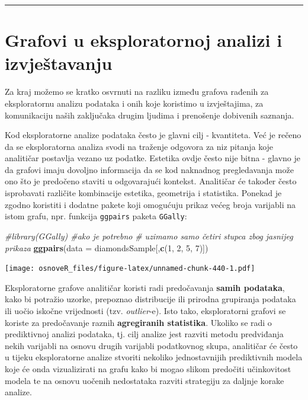 \documentclass[]{book}
\newenvironment{Shaded}{\begin{snugshade}}{\end{snugshade}}
\newcommand{\KeywordTok}[1]{\textcolor[rgb]{0.13,0.29,0.53}{\textbf{#1}}}
\newcommand{\DataTypeTok}[1]{\textcolor[rgb]{0.13,0.29,0.53}{#1}}
\newcommand{\DecValTok}[1]{\textcolor[rgb]{0.00,0.00,0.81}{#1}}
\newcommand{\CommentTok}[1]{\textcolor[rgb]{0.56,0.35,0.01}{\textit{#1}}}
\newcommand{\NormalTok}[1]{#1}
\theoremstyle{definition}
\theoremstyle{definition}
\theoremstyle{definition}
\theoremstyle{remark}
\begin{document}
\begin{center}\rule{0.5\linewidth}{\linethickness}\end{center}

\section{Grafovi u eksploratornoj analizi i
izvještavanju}\label{grafovi-u-eksploratornoj-analizi-i-izvjestavanju}

Za kraj možemo se kratko osvrnuti na razliku između grafova rađenih za
eksploratornu analizu podataka i onih koje koristimo u izvještajima, za
komunikaciju naših zaključaka drugim ljudima i prenošenje dobivenih
saznanja.

Kod eksploratorne analize podataka često je glavni cilj - kvantiteta.
Već je rečeno da se eksploratorna analiza svodi na traženje odgovora za
niz pitanja koje analitičar postavlja vezano uz podatke. Estetika ovdje
često nije bitna - glavno je da grafovi imaju dovoljno informacija da se
kod naknadnog pregledavanja može ono što je predočeno staviti u
odgovarajući kontekst. Analitičar će također često isprobavati različite
kombinacije estetika, geometrija i statistika. Ponekad je zgodno
koristiti i dodatne pakete koji omogućuju prikaz većeg broja varijabli
na istom grafu, npr. funkcija \texttt{ggpairs} paketa \texttt{GGally}:

\begin{Shaded}
\begin{Highlighting}[]
\CommentTok{#library(GGally)        #ako je potrebno}
\CommentTok{# uzimamo samo četiri stupca zbog jasnijeg prikaza}
\KeywordTok{ggpairs}\NormalTok{(}\DataTypeTok{data =}\NormalTok{ diamondsSample[,}\KeywordTok{c}\NormalTok{(}\DecValTok{1}\NormalTok{, }\DecValTok{2}\NormalTok{, }\DecValTok{5}\NormalTok{, }\DecValTok{7}\NormalTok{)])}
\end{Highlighting}
\end{Shaded}

\texttt{[image: osnoveR\_files/figure-latex/unnamed-chunk-440-1.pdf]}

Eksploratorne grafove analitičar koristi radi predočavanja \textbf{samih
podataka}, kako bi potražio uzorke, prepoznao distribucije ili prirodna
grupiranja podataka ili uočio iskočne vrijednosti (tzv.
\emph{outlier}-e). Isto tako, eksploratorni grafovi se koriste za
predočavanje raznih \textbf{agregiranih statistika}. Ukoliko se radi o
prediktivnoj analizi podataka, tj. cilj analize jest razviti metodu
predviđanja nekih varijabli na osnovu drugih varijabli podatkovnog
skupa, analitičar će često u tijeku eksploratorne analize stvoriti
nekoliko jednostavnijih prediktivnih modela koje će onda vizualizirati
na grafu kako bi mogao slikom predočiti učinkovitost modela te na osnovu
uočenih nedostataka razviti strategiju za daljnje korake analize.
\end{document}
